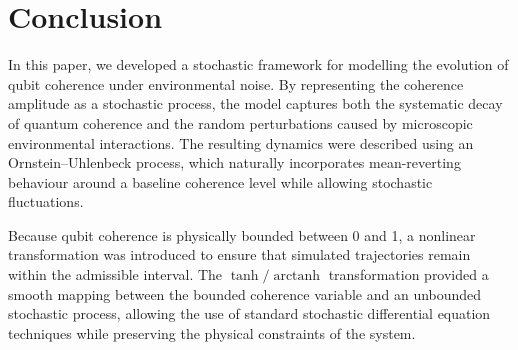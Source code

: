 \documentclass[
	a4paper, %
	10pt, %
	unnumberedsections, %
	twoside, %
]{LTJournalArticle}
\begin{document}







\section{Conclusion}


In this paper, we developed a stochastic framework for modelling the evolution of qubit coherence under environmental noise. By representing the coherence amplitude as a stochastic process, the model captures both the systematic decay of quantum coherence and the random perturbations caused by microscopic environmental interactions. The resulting dynamics were described using an Ornstein–Uhlenbeck process, which naturally incorporates mean-reverting behaviour around a baseline coherence level while allowing stochastic fluctuations.

Because qubit coherence is physically bounded between 0 and 1, a nonlinear transformation was introduced to ensure that simulated trajectories remain within the admissible interval. The $\tanh/\operatorname{arctanh}$ transformation provided a smooth mapping between the bounded coherence variable and an unbounded stochastic process, allowing the use of standard stochastic differential equation techniques while preserving the physical constraints of the system.
\end{document}
